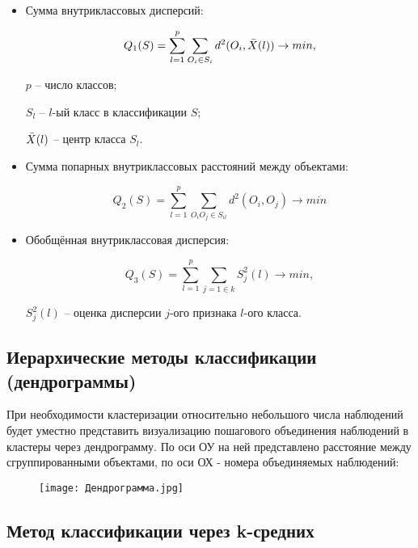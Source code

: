 \documentclass[a4paper,12pt]{article} %
\begin{document}
\begin{itemize}
    \item Сумма внутриклассовых дисперсий:
    
    \begin{equation*}
        Q_{1}(S) = \sum_{l=1}^{p}\sum_{O_{i} \in S_{i}}d^{2}(O_{i}, \Bar{X}(l)) \rightarrow min,
    \end{equation*}
    
    $p$ -- число классов;
    
    $S_{l}$ -- $l$-ый класс в классификации $S$;
    
    $\Bar{X}(l)$ -- центр класса $S_{l}$.
    
    \item Сумма попарных внутриклассовых расстояний между объектами:
    
    \begin{equation*}
        Q_{2}(S) = \sum_{l=1}^{p}\sum_{O_{i}O_{j} \in S_{il}}d^{2}(O_{i}, O_{j}) \rightarrow min
    \end{equation*}
        
    \item Обобщённая внутриклассовая дисперсия:
    
    \begin{equation*}
        Q_{3}(S) = \sum_{l=1}^{p}\sum_{j=1 \in k}S_{j}^{2}(l) \rightarrow min,
    \end{equation*} 
    
    $S_{j}^{2}(l)$ -- оценка дисперсии $j$-ого признака $l$-ого класса.
    
\end{itemize}

\subsection{Иерархические методы классификации (дендрограммы)}

При необходимости кластеризации относительно небольшого числа наблюдений будет уместно представить визуализацию пошагового объединения наблюдений в кластеры через дендрограмму. По оси ОУ на ней представлено расстояние между сгруппированными объектами, по оси ОХ - номера объединяемых наблюдений:

\begin{figure}[htp]
    \centering
    \texttt{[image: Дендрограмма.jpg]}
\end{figure}

\subsection{Метод классификации через k-средних}
\end{document}
